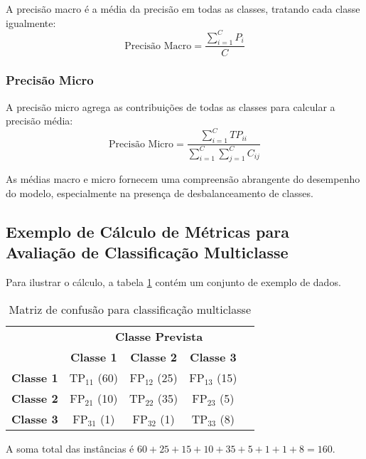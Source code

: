 A precisão macro é a média da precisão em todas as classes, tratando cada classe igualmente:
\[ \text{Precisão Macro} = \frac{\sum_{i=1}^{C} P_i}{C} \]

\subsubsection{Precisão Micro}

A precisão micro agrega as contribuições de todas as classes para calcular a precisão média:
\[ \text{Precisão Micro} = \frac{\sum_{i=1}^{C} TP_{ii}}{\sum_{i=1}^{C} \sum_{j=1}^{C} C_{ij}} \]

As médias macro e micro fornecem uma compreensão abrangente do desempenho do modelo, especialmente na presença de desbalanceamento de classes.

\subsection{Exemplo de Cálculo de Métricas para Avaliação de Classificação Multiclasse}

Para ilustrar o cálculo, a tabela \ref{tab:confusion_matrix_multiclass_example} contém um conjunto de exemplo de dados.

\begin{table}[h]
\centering
\caption{Matriz de confusão para classificação multiclasse}
\label{tab:confusion_matrix_multiclass_example}
\begin{tabular}{c|c|c|c|c}
\multicolumn{1}{c}{} & \multicolumn{4}{c}{\textbf{Classe Prevista}} \\ \cline{2-5} 
\multicolumn{1}{c|}{} & \textbf{Classe 1} & \textbf{Classe 2} & \textbf{Classe 3} \\ \hline
\rowcolor{red!25} \textbf{Classe 1} & \cellcolor{green!25}TP$_{11}$ (60) & \cellcolor{red!25}FP$_{12}$ (25) & \cellcolor{red!25}FP$_{13}$ (15) \\ \hline
\rowcolor{red!25} \textbf{Classe 2} & \cellcolor{red!25}FP$_{21}$ (10) & \cellcolor{green!25}TP$_{22}$ (35) & \cellcolor{red!25}FP$_{23}$ (5) \\ \hline
\rowcolor{red!25} \textbf{Classe 3} & \cellcolor{red!25}FP$_{31}$ (1) & \cellcolor{red!25}FP$_{32}$ (1) & \cellcolor{green!25}TP$_{33}$ (8) \\ \hline
\end{tabular}
\end{table}

A soma total das instâncias é \(60 + 25 + 15 + 10 + 35 + 5 + 1 + 1 + 8 = 160\).

